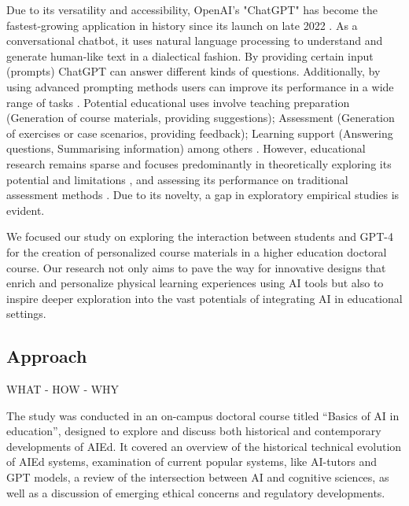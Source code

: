 \documentclass[sn-mathphys, Numbered]{sn-jnl}%
\theoremstyle{thmstyleone}%
\theoremstyle{thmstyletwo}%
\theoremstyle{thmstylethree}%
\begin{document}
Due to its versatility and accessibility, OpenAI's "ChatGPT" has become the fastest-growing application in history since its launch on late 2022 \parencite{milmo_chatgpt_2023}. As a conversational chatbot, it uses natural language processing to understand and generate human-like text in a dialectical fashion. By providing certain input (prompts) ChatGPT can answer different kinds of questions. Additionally, by using advanced prompting methods users can improve its performance in a wide range of tasks \parencite{wei_chain--thought_2023,fernando_promptbreeder_2023}. Potential educational uses involve teaching preparation (Generation of course materials, providing suggestions); Assessment (Generation of exercises or case scenarios, providing feedback); Learning support (Answering questions, Summarising information) among others \parencite{lo_what_2023,montenegro-rueda_impact_2023}.  However, educational research remains sparse and focuses predominantly in theoretically exploring its potential and limitations \parencite{qadir_engineering_2022,cain_gpteammate_2023}, and assessing its performance on traditional assessment methods \parencite{nisar_is_2023}. Due to its novelty, a gap in exploratory empirical studies is evident.

We focused our study on exploring the interaction between students and GPT-4 for the creation of personalized course materials in a higher education doctoral course. Our research not only aims to pave the way for innovative designs that enrich and personalize physical learning experiences using AI tools but also to inspire deeper exploration into the vast potentials of integrating AI in educational settings. 




\subsection{Approach}\label{Approach}  WHAT - HOW - WHY

The study was conducted in an on-campus doctoral course titled “Basics of AI in education”, designed to explore and discuss both historical and contemporary developments of AIEd. It covered an overview of the historical technical evolution of AIEd systems, examination of current popular systems, like AI-tutors and GPT models, a review of the intersection between AI and cognitive sciences, as well as a discussion of emerging ethical concerns and regulatory developments. 
\end{document}
